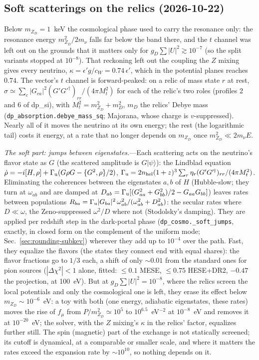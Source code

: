 \documentclass[11pt,a4paper]{article}
\newcommand{\file}[1]{\nolinkurl{#1}}
\newcommand{\mzd}{m_{Z_D}}
\newcommand{\gd}{g_D}
\newcommand{\epsp}{\epsilon'}
\begin{document}
\subsection{Soft scatterings on the relics (2026-10-22)}
\label{sec:soft-scatterings}

Below $\mzd = 1$~keV the cosmological phase used to carry the resonance only: the resonance energy
$\mzd^2/2m_\nu$ falls far below the band there, and the $t$ channel was left out on the grounds that it
matters only for $\gd\sum|U|^2 \gtrsim 10^{-7}$ (so the split variants stopped at $10^{-8}$). That
reckoning left out the coupling the $Z$ mixing gives every neutrino, $\kappa = \epsp g/c_W = 0.74\,\epsp$,
which in the potential planes reaches $0.74$. The vector's $t$ channel is forward-peaked: on a relic of
mass state $r$ at rest, $\sigma \simeq \sum_c |G_{ca}|^2 (G'G'^\dagger)_{rr}/(4\pi M_t^2)$ for each of the
relic's two roles (profiles 2 and 6 of dp\_si), with $M_t^2 = \mzd^2 + m_D^2$, $m_D$ the relics' Debye mass
(\file{dp\_absorption.debye\_mass\_sq}; Majorana, whose charge is $v$-suppressed). Nearly all of it moves
the neutrino at its own energy; the rest (the logarithmic tail) costs it energy, at a rate that no longer
depends on $\mzd$ once $\mzd^2 \ll 2m_\nu E$.

\textit{The soft part: jumps between eigenstates.}---Each scattering acts on the neutrino's flavor state
as $G$ (the scattered amplitude is $G|\psi\rangle$): the Lindblad equation
$\dot\rho = -i[H,\rho] + \Gamma_{\rm u}(G\rho G - \{G^2,\rho\}/2)$, $\Gamma_{\rm u} = 2n_{\rm hel}(1+z)^3
\sum_r \eta_r (G'G'^\dagger)_{rr}/(4\pi M_t^2)$. Eliminating the coherences between the eigenstates $a,b$
of $H$ (Hubble-slow; they turn at $\omega_{ab}$ and are damped at $D_{ab} = \Gamma_{\rm u}[(G^2_{aa} +
G^2_{bb})/2 - G_{aa}G_{bb}]$) leaves rates between populations $R_{ba} = \Gamma_{\rm u}|G_{ba}|^2\,
\omega_{ab}^2/(\omega_{ab}^2 + D_{ab}^2)$: the secular rates where $D \ll \omega$, the Zeno-suppressed
$\omega^2/D$ where not (Stodolsky's damping). They are applied per redshift step in the dark-portal phase
(\file{dp\_cosmo.\_soft\_jumps}, exactly, in closed form on the complement of the uniform mode;
Sec.~\ref{sec:rounding-subkev}) wherever they add up
to $10^{-4}$ over the path. Fast, they equalize the flavors (the states they connect end with equal shares):
the flavor fractions go to $1/3$ each, a shift of only $\sim0.01$ from the standard ones for pion sources
($|\Delta\chi^2| < 1$ alone, fitted: $\le0.1$ MESE, $\le0.75$ HESE+DR2, $-0.47$ the projection, at 100~eV).
But at $\gd\sum|U|^2 = 10^{-8}$, where the relics screen the local potentials and only the cosmological one
is left, they erase its effect below $\mzd\sim10^{-6}$~eV: a toy with both (one energy, adiabatic
eigenstates, these rates) moves the rise of $f_\mu$ from $P/\mzd^2 \simeq 10^5$ to $10^{6.5}$~eV$^{-2}$ at
$10^{-8}$~eV and removes it at $10^{-20}$~eV; the solver, with the $Z$ mixing's $\kappa$ in the relics'
factor, equalizes further still. The spin (magnetic) part of the exchange is not statically screened; its
cutoff is dynamical, at a comparable or smaller scale, and where it matters the rates exceed the expansion
rate by $\sim10^{10}$, so nothing depends on it.
\end{document}
